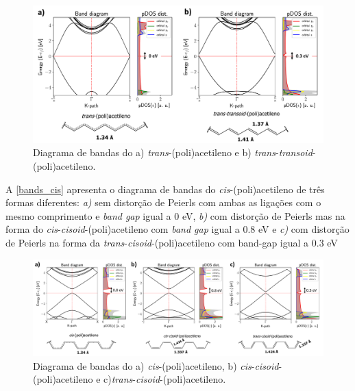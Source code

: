 \documentclass[
	12pt,				%
	openright,			%
	twoside,			%
	a4paper,			%
	chapter=TITLE,		%
	english,			%
	french,				%
	spanish,			%
	brazil				%
	]{abntex2}
\begin{document}
\begin{apendicesenv}
	\begin{figure}[!ht]
		\centering
		\includegraphics[width=.65\linewidth]{capitulos/fig/apendices/trans_poliacetileno}
		\caption{Diagrama de bandas do a) \textit{trans}-(poli)acetileno e b) \textit{trans}-\textit{transoid}-(poli)acetileno.}
		\label{bands_trans}
	\end{figure}

	A \autoref{bands_cis} apresenta o diagrama de bandas do \textit{cis}-(poli)acetileno de três formas diferentes: \textit{a)} sem distorção de Peierls com ambas as ligações com o mesmo comprimento e \textit{band gap} igual a 0 eV, \textit{b)} com distorção de Peierls mas na forma do \textit{cis}-\textit{cisoid}-(poli)acetileno com \textit{band gap} igual a 0.8 eV e \textit{c)} com distorção de Peierls na forma da \textit{trans}-\textit{cisoid}-(poli)acetileno com band-gap igual a 0.3 eV

	\begin{figure}[!ht]
		\centering
		\includegraphics[width=1\linewidth]{capitulos/fig/apendices/cis_poliacetileno}
		\caption{Diagrama de bandas do a) \textit{cis}-(poli)acetileno, b) \textit{cis}-\textit{cisoid}-(poli)acetileno e c)\textit{trans}-\textit{cisoid}-(poli)acetileno.}
		\label{bands_cis}
	\end{figure}




\end{apendicesenv}



\end{document}
